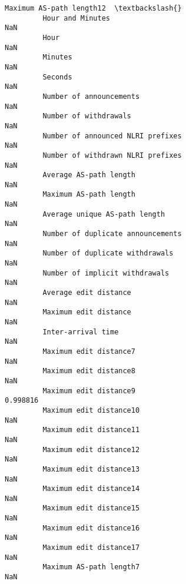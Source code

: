 \documentclass[11pt]{article}
\begin{document}
\begin{Verbatim}[commandchars=\\\{\}]
                                                            Maximum AS-path length12  \textbackslash{}
         Hour and Minutes                                                        NaN   
         Hour                                                                    NaN   
         Minutes                                                                 NaN   
         Seconds                                                                 NaN   
         Number of announcements                                                 NaN   
         Number of withdrawals                                                   NaN   
         Number of announced NLRI prefixes                                       NaN   
         Number of withdrawn NLRI prefixes                                       NaN   
         Average AS-path length                                                  NaN   
         Maximum AS-path length                                                  NaN   
         Average unique AS-path length                                           NaN   
         Number of duplicate announcements                                       NaN   
         Number of duplicate withdrawals                                         NaN   
         Number of implicit withdrawals                                          NaN   
         Average edit distance                                                   NaN   
         Maximum edit distance                                                   NaN   
         Inter-arrival time                                                      NaN   
         Maximum edit distance7                                                  NaN   
         Maximum edit distance8                                                  NaN   
         Maximum edit distance9                                             0.998816   
         Maximum edit distance10                                                 NaN   
         Maximum edit distance11                                                 NaN   
         Maximum edit distance12                                                 NaN   
         Maximum edit distance13                                                 NaN   
         Maximum edit distance14                                                 NaN   
         Maximum edit distance15                                                 NaN   
         Maximum edit distance16                                                 NaN   
         Maximum edit distance17                                                 NaN   
         Maximum AS-path length7                                                 NaN   

\end{Verbatim}
\end{document}
